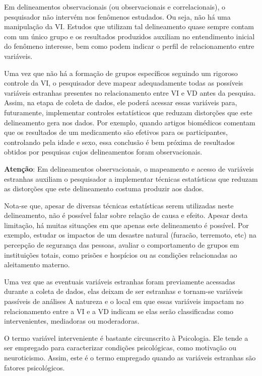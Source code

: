 \documentclass[
]{book}
\begin{document}
Em delineamentos observacionais (ou observacionais e correlacionais), o pesquisador não intervém nos fenômenos estudados. Ou seja, não há uma manipulação da VI. Estudos que utilizam tal delineamento quase sempre contam com um único grupo e os resultados produzidos auxiliam no entendimento inicial do fenômeno interesse, bem como podem indicar o perfil de relacionamento entre variáveis.

Uma vez que não há a formação de grupos específicos seguindo um rigoroso controle da VI, o pesquisador deve mapear adequadamente todas as possíveis variáveis estranhas presentes no relacionamento entre VI e VD antes da pesquisa. Assim, na etapa de coleta de dados, ele poderá acessar essas variáveis para, futuramente, implementar controles estatísticos que reduzam distorções que este delineamento gera nos dados. Por exemplo, quando artigos biomédicos comentam que os resultados de um medicamento são efetivos para os participantes, controlando pela idade e sexo, essa conclusão é bem próxima de resultados obtidos por pesquisas cujos delineamentos foram observacionais.

\textbf{Atenção}: Em delineamentos observacionais, o mapeamento e acesso de variáveis estranhas auxiliam o pesquisador a implementar técnicas estatísticas que reduzam as distorções que este delineamento costuma produzir aos dados.

Nota-se que, apesar de diversas técnicas estatísticas serem utilizadas neste delineamento, não é possível falar sobre relação de causa e efeito. Apesar desta limitação, há muitas situações em que apenas este delineamento é possível. Por exemplo, estudar os impactos de um desastre natural (furacão, terremoto, etc) na percepção de segurança das pessoas, avaliar o comportamento de grupos em instituições totais, como prisões e hospícios ou as condições relacionadas ao aleitamento materno.

Uma vez que as eventuais variáveis estranhas foram previamente acessadas durante a coleta de dados, elas deixam de ser estranhas e tornam-se variáveis passíveis de análises A natureza e o local em que essas variáveis impactam no relacionamento entre a VI e a VD indicam se elas serão classificadas como intervenientes, mediadoras ou moderadoras.

O termo variável interveniente é bastante circunscrito à Psicologia. Ele tende a ser empregado para caracterizar condições psicológicas, como motivação ou neuroticismo. Assim, este é o termo empregado quando as variáveis estranhas são fatores psicológicos.
\end{document}
